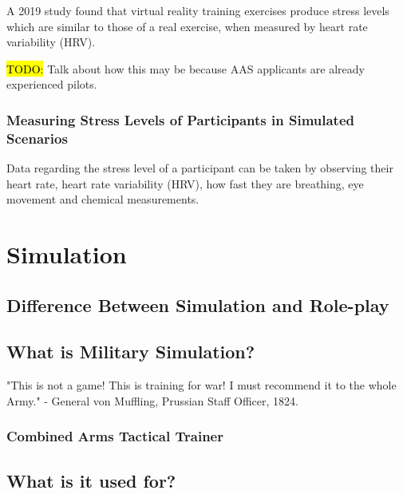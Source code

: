 \documentclass{article}
\begin{document}

A 2019 study found that virtual reality training exercises produce stress levels which are similar to those of a real exercise, when measured by heart rate variability (HRV). \cite{8797889}

\hl{TODO:} Talk about how this may be because AAS applicants are already experienced pilots.

\subsubsection{Measuring Stress Levels of Participants in Simulated Scenarios}

Data regarding the stress level of a participant can be taken by observing their heart rate, heart rate variability (HRV), how fast they are breathing, eye movement and chemical measurements. \cite{8797889}

\section{Simulation}

\subsection{Difference Between Simulation and Role-play}



\subsection{What is Military Simulation?}

"This is not a game! This is training for war! I must recommend it to the whole Army." - General von Muffling, Prussian Staff Officer, 1824.

\subsubsection{Combined Arms Tactical Trainer}




\subsection{What is it used for?}
\end{document}
